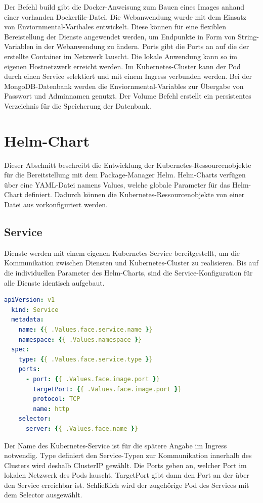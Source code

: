 Der Befehl build gibt die Docker-Anweisung zum Bauen eines Images anhand einer vorhanden Dockerfile-Datei.
Die Webanwendung wurde mit dem Einsatz von Enviornmental-Varibales entwickelt.
Diese können für eine flexiblen Bereistellung der Dienste angewendet werden, um Endpunkte in Form von String-Variablen in der Webanwendung zu ändern.
Ports gibt die Ports an auf die der erstellte Container im Netzwerk lauscht.
Die lokale Anwendung kann so im eigenen Hostnetzwerk erreicht werden.
Im Kubernetes-Cluster kann der Pod durch einen Service selektiert und mit einem Ingress verbunden werden.
Bei der MongoDB-Datenbank werden die Enviornmental-Variables zur Übergabe von Passwort und Adminnamen genutzt.
Der Volume Befehl erstellt ein persistentes Verzeichnis für die Speicherung der Datenbank.


\section{Helm-Chart}\label{helmcharts}
Dieser Abschnitt beschreibt die Entwicklung der Kubernetes-Ressourcenobjekte für die Bereitstellung mit dem Package-Manager Helm.
Helm-Charts verfügen über eine YAML-Datei namens Values, welche globale Parameter für das Helm-Chart definiert.
Dadurch können die Kubernetes-Ressourcenobjekte von einer Datei aus vorkonfiguriert werden.



\subsection{Service}
Dienste werden mit einem eigenen Kubernetes-Service bereitgestellt, um die Kommunikation zwischen Diensten und Kubernetes-Cluster zu realisieren.
Bis auf die individuellen Parameter des Helm-Charts, sind die Service-Konfiguration für alle Dienste identisch aufgebaut.

\begin{lstlisting}[caption={face-service.yaml},captionpos=b,label={lst:face-service},language=yaml]
  apiVersion: v1
  kind: Service
  metadata:
    name: {{ .Values.face.service.name }}
    namespace: {{ .Values.namespace }}
  spec:
    type: {{ .Values.face.service.type }}
    ports:
      - port: {{ .Values.face.image.port }}
        targetPort: {{ .Values.face.image.port }}
        protocol: TCP
        name: http
    selector:
      server: {{ .Values.face.name }}

\end{lstlisting}

Der Name des Kubernetes-Service ist für die spätere Angabe im Ingress notwendig.
Type definiert den Service-Typen zur Kommunikation innerhalb des Clusters wird deshalb ClusterIP gewählt.
Die Ports geben an, welcher Port im lokalen Netzwerk des Pods lauscht.
TargetPort gibt dann den Port an der über den Service erreichbar ist.
Schließlich wird der zugehörige Pod des Services mit dem Selector ausgewählt.


